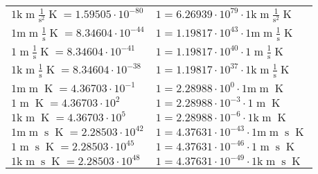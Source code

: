 \begin{center}
\begin{longtable}{l l}
{\color{gray}$1 \bm{\mathrm{ k}}{\operatorname{m}}\frac1{\operatorname{s}^2}{}{\operatorname{K}} = 1.59505\cdot10^{-80} $}   & {\color{gray}$ 1 = 6.26939\cdot10^{79} \cdot 1 \bm{\mathrm{ k}}{\operatorname{m}}\frac1{\operatorname{s}^2}{}{\operatorname{K}}$}  \\
{\color{gray}$1 \bm{\mathrm{ m}}{\operatorname{m}}\frac1{\operatorname{s}}{}{\operatorname{K}} = 8.34604\cdot10^{-44} $}   & {\color{gray}$ 1 = 1.19817\cdot10^{43} \cdot 1 \bm{\mathrm{ m}}{\operatorname{m}}\frac1{\operatorname{s}}{}{\operatorname{K}}$}  \\
{\color{black}$1 \bm{\mathrm{ }}{\operatorname{m}}\frac1{\operatorname{s}}{}{\operatorname{K}} = 8.34604\cdot10^{-41} $}   & {\color{black}$ 1 = 1.19817\cdot10^{40} \cdot 1 \bm{\mathrm{ }}{\operatorname{m}}\frac1{\operatorname{s}}{}{\operatorname{K}}$}  \\
{\color{gray}$1 \bm{\mathrm{ k}}{\operatorname{m}}\frac1{\operatorname{s}}{}{\operatorname{K}} = 8.34604\cdot10^{-38} $}   & {\color{gray}$ 1 = 1.19817\cdot10^{37} \cdot 1 \bm{\mathrm{ k}}{\operatorname{m}}\frac1{\operatorname{s}}{}{\operatorname{K}}$}  \\
{\color{gray}$1 \bm{\mathrm{ m}}{\operatorname{m}}{}{}{\operatorname{K}} = 4.36703\cdot10^{-1} $}   & {\color{gray}$ 1 = 2.28988\cdot10^{0} \cdot 1 \bm{\mathrm{ m}}{\operatorname{m}}{}{}{\operatorname{K}}$}  \\
{\color{black}$1 \bm{\mathrm{ }}{\operatorname{m}}{}{}{\operatorname{K}} = 4.36703\cdot10^{2} $}   & {\color{black}$ 1 = 2.28988\cdot10^{-3} \cdot 1 \bm{\mathrm{ }}{\operatorname{m}}{}{}{\operatorname{K}}$}  \\
{\color{gray}$1 \bm{\mathrm{ k}}{\operatorname{m}}{}{}{\operatorname{K}} = 4.36703\cdot10^{5} $}   & {\color{gray}$ 1 = 2.28988\cdot10^{-6} \cdot 1 \bm{\mathrm{ k}}{\operatorname{m}}{}{}{\operatorname{K}}$}  \\
{\color{gray}$1 \bm{\mathrm{ m}}{\operatorname{m}}{\operatorname{s}}{}{\operatorname{K}} = 2.28503\cdot10^{42} $}   & {\color{gray}$ 1 = 4.37631\cdot10^{-43} \cdot 1 \bm{\mathrm{ m}}{\operatorname{m}}{\operatorname{s}}{}{\operatorname{K}}$}  \\
{\color{black}$1 \bm{\mathrm{ }}{\operatorname{m}}{\operatorname{s}}{}{\operatorname{K}} = 2.28503\cdot10^{45} $}   & {\color{black}$ 1 = 4.37631\cdot10^{-46} \cdot 1 \bm{\mathrm{ }}{\operatorname{m}}{\operatorname{s}}{}{\operatorname{K}}$}  \\
{\color{gray}$1 \bm{\mathrm{ k}}{\operatorname{m}}{\operatorname{s}}{}{\operatorname{K}} = 2.28503\cdot10^{48} $}   & {\color{gray}$ 1 = 4.37631\cdot10^{-49} \cdot 1 \bm{\mathrm{ k}}{\operatorname{m}}{\operatorname{s}}{}{\operatorname{K}}$}  \\

\end{longtable}
\end{center}
